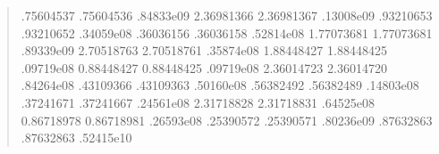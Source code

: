 \documentclass[letterpaper,10pt,english]{sphinxmanual}
\begin{document}
\begin{enumerate}
\begin{quote}
\begin{sphinxVerbatim}[commandchars=\\\{\}]
     .75604537           .75604536  .84833e\PYGZhy{}09 
    \PYGZhy{}2.36981366          \PYGZhy{}2.36981367  .13008e\PYGZhy{}09 
     .93210653           .93210652  .34059e\PYGZhy{}08 
     .36036156           .36036158  .52814e\PYGZhy{}08 
    \PYGZhy{}1.77073681          \PYGZhy{}1.77073681  .89339e\PYGZhy{}09 
    \PYGZhy{}2.70518763          \PYGZhy{}2.70518761  .35874e\PYGZhy{}08 
    \PYGZhy{}1.88448427          \PYGZhy{}1.88448425  .09719e\PYGZhy{}08 
    \PYGZhy{}0.88448427          \PYGZhy{}0.88448425  .09719e\PYGZhy{}08 
    \PYGZhy{}2.36014723          \PYGZhy{}2.36014720  .84264e\PYGZhy{}08 
     .43109366           .43109363  .50160e\PYGZhy{}08 
     .56382492           .56382489  .14803e\PYGZhy{}08 
     .37241671           .37241667  .24561e\PYGZhy{}08 
    \PYGZhy{}2.31718828          \PYGZhy{}2.31718831  .64525e\PYGZhy{}08 
    \PYGZhy{}0.86718978          \PYGZhy{}0.86718981  .26593e\PYGZhy{}08 
     .25390572           .25390571  .80236e\PYGZhy{}09 
     .87632863           .87632863  .52415e\PYGZhy{}10 

\end{sphinxVerbatim}
\end{quote}
\end{enumerate}
\end{document}
